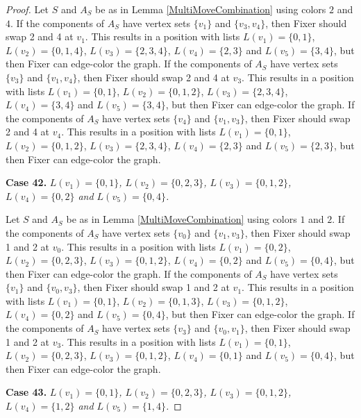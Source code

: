 \documentclass[12pt]{amsart}
\theoremstyle{plain}
\theoremstyle{definition}
\theoremstyle{remark}
\begin{document}
\begin{proof}
Let $S$ and $A_S$ be as in Lemma \ref{MultiMoveCombination} using colors $2$ and $4$. If the components of $A_S$ have vertex sets $\{v_1\}$ and $\{v_3, v_4\}$, then Fixer should swap 2 and 4 at $v_1$. This results in a position with lists $L(v_1) = \{0, 1\}$, $L(v_2) = \{0, 1, 4\}$, $L(v_3) = \{2, 3, 4\}$, $L(v_4) = \{2, 3\}$ and $L(v_5) = \{3, 4\}$, but then Fixer can edge-color the graph.
If the components of $A_S$ have vertex sets $\{v_3\}$ and $\{v_1, v_4\}$, then Fixer should swap 2 and 4 at $v_3$. This results in a position with lists $L(v_1) = \{0, 1\}$, $L(v_2) = \{0, 1, 2\}$, $L(v_3) = \{2, 3, 4\}$, $L(v_4) = \{3, 4\}$ and $L(v_5) = \{3, 4\}$, but then Fixer can edge-color the graph.
If the components of $A_S$ have vertex sets $\{v_4\}$ and $\{v_1, v_3\}$, then Fixer should swap 2 and 4 at $v_4$. This results in a position with lists $L(v_1) = \{0, 1\}$, $L(v_2) = \{0, 1, 2\}$, $L(v_3) = \{2, 3, 4\}$, $L(v_4) = \{2, 3\}$ and $L(v_5) = \{2, 3\}$, but then Fixer can edge-color the graph.

\noindent\textbf{Case 42.  }\textit{$L(v_1) = \{0, 1\}$, $L(v_2) = \{0, 2, 3\}$, $L(v_3) = \{0, 1, 2\}$, $L(v_4) = \{0, 2\}$ and $L(v_5) = \{0, 4\}$.}

Let $S$ and $A_S$ be as in Lemma \ref{MultiMoveCombination} using colors $1$ and $2$. If the components of $A_S$ have vertex sets $\{v_0\}$ and $\{v_1, v_3\}$, then Fixer should swap 1 and 2 at $v_0$. This results in a position with lists $L(v_1) = \{0, 2\}$, $L(v_2) = \{0, 2, 3\}$, $L(v_3) = \{0, 1, 2\}$, $L(v_4) = \{0, 2\}$ and $L(v_5) = \{0, 4\}$, but then Fixer can edge-color the graph.
If the components of $A_S$ have vertex sets $\{v_1\}$ and $\{v_0, v_3\}$, then Fixer should swap 1 and 2 at $v_1$. This results in a position with lists $L(v_1) = \{0, 1\}$, $L(v_2) = \{0, 1, 3\}$, $L(v_3) = \{0, 1, 2\}$, $L(v_4) = \{0, 2\}$ and $L(v_5) = \{0, 4\}$, but then Fixer can edge-color the graph.
If the components of $A_S$ have vertex sets $\{v_3\}$ and $\{v_0, v_1\}$, then Fixer should swap 1 and 2 at $v_3$. This results in a position with lists $L(v_1) = \{0, 1\}$, $L(v_2) = \{0, 2, 3\}$, $L(v_3) = \{0, 1, 2\}$, $L(v_4) = \{0, 1\}$ and $L(v_5) = \{0, 4\}$, but then Fixer can edge-color the graph.

\noindent\textbf{Case 43.  }\textit{$L(v_1) = \{0, 1\}$, $L(v_2) = \{0, 2, 3\}$, $L(v_3) = \{0, 1, 2\}$, $L(v_4) = \{1, 2\}$ and $L(v_5) = \{1, 4\}$.}


\end{proof}
\end{document}
